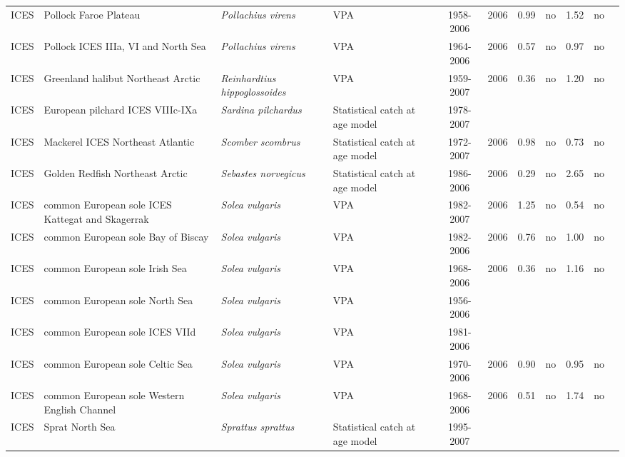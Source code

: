 \begin{longtable}{p{1.8cm}p{3.5cm}p{3.5cm}p{3cm}cccp{0.9cm}cp{0.9cm}c}
  ICES & Pollock Faroe Plateau & \textit{Pollachius virens} & VPA & 1958-2006 & 2006 & 0.99 & no & 1.52 & no & \cite{ICES-NWWG-2007.pdf} \\ 
  ICES & Pollock ICES IIIa, VI and North Sea & \textit{Pollachius virens} & VPA & 1964-2006 & 2006 & 0.57 & no & 0.97 & no & \cite{ICES-WGNSSK-2007.pdf} \\ 
  ICES & Greenland halibut Northeast Arctic & \textit{Reinhardtius hippoglossoides} & VPA & 1959-2007 & 2006 & 0.36 & no & 1.20 & no & \cite{ICES-AFWG-2007.pdf} \\ 
  ICES & European pilchard ICES VIIIc-IXa & \textit{Sardina pilchardus} & Statistical catch at age model & 1978-2007 &  &  &  &  &  & \cite{ICES-WGMHSA07.pdf} \\ 
  ICES & Mackerel ICES Northeast Atlantic & \textit{Scomber scombrus} & Statistical catch at age model & 1972-2007 & 2006 & 0.98 & no & 0.73 & no & \cite{ICES-WGMHSA07.pdf} \\ 
  ICES & Golden Redfish Northeast Arctic & \textit{Sebastes norvegicus} & Statistical catch at age model & 1986-2006 & 2006 & 0.29 & no & 2.65 & no & \cite{ICES-AFWG-2007.pdf} \\ 
  ICES & common European sole ICES Kattegat and Skagerrak & \textit{Solea vulgaris} & VPA & 1982-2007 & 2006 & 1.25 & no & 0.54 & no & \cite{ICES-WGBFAS-2007.pdf} \\ 
  ICES & common European sole Bay of Biscay & \textit{Solea vulgaris} & VPA & 1982-2006 & 2006 & 0.76 & no & 1.00 & no & \cite{ICES-WGHMM-2007.pdf} \\ 
  ICES & common European sole Irish Sea & \textit{Solea vulgaris} & VPA & 1968-2006 & 2006 & 0.36 & no & 1.16 & no & \cite{ICES-WGNSDS-2007.pdf} \\ 
  ICES & common European sole North Sea & \textit{Solea vulgaris} & VPA & 1956-2006 &  &  &  &  &  & \cite{ICES-WGNSSK-2007.pdf} \\ 
  ICES & common European sole ICES VIId & \textit{Solea vulgaris} & VPA & 1981-2006 &  &  &  &  &  & \cite{ICES-WGNSSK-2007.pdf} \\ 
  ICES & common European sole Celtic Sea & \textit{Solea vulgaris} & VPA & 1970-2006 & 2006 & 0.90 & no & 0.95 & no & \cite{ICES-WGSSDS-2007.pdf} \\ 
  ICES & common European sole Western English Channel & \textit{Solea vulgaris} & VPA & 1968-2006 & 2006 & 0.51 & no & 1.74 & no & \cite{ICES-WGSSDS-2007.pdf} \\ 
  ICES & Sprat North Sea & \textit{Sprattus sprattus} & Statistical catch at age model & 1995-2007 &  &  &  &  &  & \cite{ICES-HAWG-2007.pdf} \\ 

\end{longtable}
